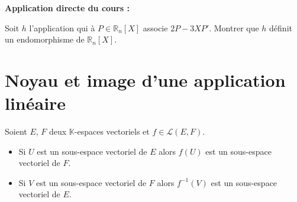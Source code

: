 \documentclass[french,11pt,twoside]{VcCours}
\newenvironment{ApplicationDirecte}{\textbf{Application directe du cours :}

}{}
\begin{document}
\begin{ApplicationDirecte} Soit $h$ l'application qui à $P \in \mathbb{R}_n[X]$ associe $2P-3XP'$. Montrer que $h$ définit un endomorphisme de $\mathbb{R}_n[X]$.
\end{ApplicationDirecte}

\section{Noyau et image d'une application linéaire}

\begin{Theoreme}{} Soient $E$, $F$ deux $\mathbb{K}$-espaces vectoriels et $f \in \mathcal{L}(E,F)$.

\begin{itemize}
\item Si $U$ est un sous-espace vectoriel de $E$ alors $f(U)$ est un sous-espace vectoriel de $F$.
\item Si $V$ est un sous-espace vectoriel de $F$ alors $f^{-1}(V)$ est un sous-espace vectoriel de $E$.
\end{itemize}
\end{Theoreme}
\end{document}
